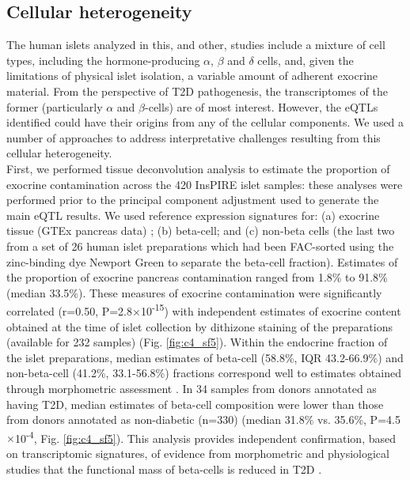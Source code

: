 \subsection{Cellular heterogeneity}	 	 	 	
The human islets analyzed in this, and other, studies include a mixture of cell types, including the hormone-producing $\alpha$, $\beta$ and $\delta$ cells, and, given the limitations of physical islet isolation, a variable amount of adherent exocrine material. From the perspective of T2D pathogenesis, the transcriptomes of the former (particularly $\alpha$ and $\beta$-cells) are of most interest. However, the eQTLs identified could have their origins from any of the cellular components. We used a number of approaches to address interpretative challenges resulting from this cellular heterogeneity. \\
    
First, we performed tissue deconvolution analysis to estimate the proportion of exocrine contamination across the 420 InsPIRE islet samples: these analyses were performed prior to the principal component adjustment used to generate the main eQTL results. We used reference expression signatures for: (a) exocrine tissue (GTEx pancreas data) \cite{gtexconsortiumGeneticEffectsGene2017}; (b) beta-cell; and (c) non-beta cells (the last two from a set of 26 human islet preparations which had been FAC-sorted using the zinc-binding dye Newport Green to separate the beta-cell fraction). Estimates of the proportion of exocrine pancreas contamination ranged from 1.8\% to 91.8\% (median 33.5\%). These measures of exocrine contamination were significantly correlated (r=0.50, P=2.8$\times$10\textsuperscript{-15}) with independent estimates of exocrine content obtained at the time of islet collection by dithizone staining of the preparations (available for 232 samples) (Fig. \ref{fig:c4_sf5}). Within the endocrine fraction of the islet preparations, median estimates of beta-cell (58.8\%, IQR 43.2-66.9\%) and non-beta-cell (41.2\%, 33.1-56.8\%) fractions correspond well to estimates obtained through morphometric assessment \cite{kimIsletArchitectureComparative2009}. In 34 samples from donors annotated as having T2D, median estimates of beta-cell composition were lower than those from donors annotated as non-diabetic (n=330) (median 31.8\% vs. 35.6\%, P=4.5$\times$10\textsuperscript{-4}, Fig. \ref{fig:c4_sf5}). This analysis provides independent confirmation, based on transcriptomic signatures, of evidence from morphometric and physiological studies that the functional mass of beta-cells is reduced in T2D \cite{meierRoleReducedVcell2013, butlerCriticalAnalysisClinical2013}. \\


